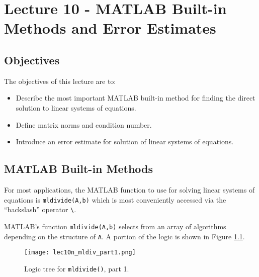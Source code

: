 \chapter{Lecture 10 - MATLAB Built-in Methods and Error Estimates}
\label{ch:lec10n}
\section{Objectives}
The objectives of this lecture are to:
\begin{itemize}
\item Describe the most important MATLAB built-in method for finding the direct solution to linear systems of equations.
\item Define matrix norms and condition number.
\item Introduce an error estimate for solution of linear systems of equations.
\end{itemize}
\setcounter{lstannotation}{0}

\section{MATLAB Built-in Methods}
For most applications, the MATLAB function to use for solving linear systems of equations is \lstinline[style=myMatlab]{mldivide(A,b)} which is most conveniently accessed via the ``backslash'' operator \lstinline[style=myMatlab]{\}.

MATLAB's function \lstinline[style=myMatlab]{mldivide(A,b)} selects from an array of algorithms depending on the structure of \lstinline[style=myMatlab]{A}.  A portion of the logic is shown in Figure \ref{fig:lec10n-mldiv-part1}.
\begin{figure}[h!]
\texttt{[image: lec10n\_mldiv\_part1.png]}
\caption{Logic tree for \lstinline[style=myMatlab]{mldivide()}, part 1.}
\label{fig:lec10n-mldiv-part1}
\end{figure}



